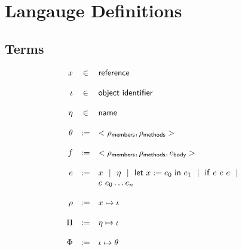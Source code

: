 \documentclass[9pt]{article}
\begin{document}
\section{Langauge Definitions}

\subsection{Terms}

\[
	\begin{array}{rcl}
	x &\in& \mathsf{reference}\\
	\\
	\iota &\in& \mathsf{object~identifier}\\
	\\
	\eta &\in& \mathsf{name}\\
	\\
	\theta &:=& <\rho_{\mathsf{members}}, \rho_{\mathsf{methods}}>\\
	\\
	f &:=& <\rho_{\mathsf{members}}, \rho_{\mathsf{methods}}, e_{\mathsf{body}}>\\
	\\
	e &:=& x ~~|~~ \eta ~~|~~ \mathsf{let}~x:=e_0~\mathsf{in}~e_1 ~~|~~ \mathsf{if}~e~e~e ~~|~~\\
	       && e~e_0 \ldots e_n\\
	\\
	\rho &:=& x \mapsto \iota\\
	\\
	\Pi &:=& \eta \mapsto \iota\\
	\\
	\Phi &:=& \iota \mapsto \theta\\
	\\
	\end{array}
\]

\end{document}
